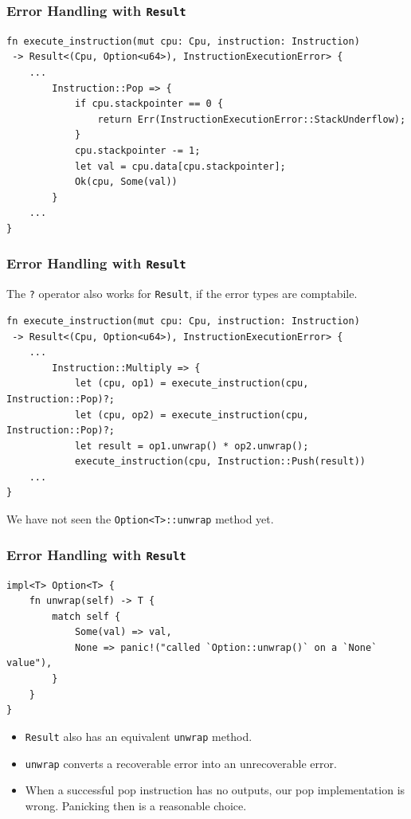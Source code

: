 \begin{frame}[fragile]
    \frametitle{Error Handling with \texttt{Result}}
    \begin{verbatim}
fn execute_instruction(mut cpu: Cpu, instruction: Instruction)
 -> Result<(Cpu, Option<u64>), InstructionExecutionError> {
    ...
        Instruction::Pop => {
            if cpu.stackpointer == 0 {
                return Err(InstructionExecutionError::StackUnderflow);
            }
            cpu.stackpointer -= 1;
            let val = cpu.data[cpu.stackpointer];
            Ok(cpu, Some(val))
        }
    ...
}
    \end{verbatim}
\end{frame}

\begin{frame}[fragile]
    \frametitle{Error Handling with \texttt{Result}}
    The \texttt{?} operator also works for \texttt{Result}, if the error types are comptabile.
    \vfill
    \begin{verbatim}
fn execute_instruction(mut cpu: Cpu, instruction: Instruction)
 -> Result<(Cpu, Option<u64>), InstructionExecutionError> {
    ...
        Instruction::Multiply => {
            let (cpu, op1) = execute_instruction(cpu, Instruction::Pop)?;
            let (cpu, op2) = execute_instruction(cpu, Instruction::Pop)?;
            let result = op1.unwrap() * op2.unwrap();
            execute_instruction(cpu, Instruction::Push(result))
    ...
}
    \end{verbatim}
    \pause
    \vfill
    We have not seen the \texttt{Option<T>::unwrap} method yet.
\end{frame}

\begin{frame}[fragile]
    \frametitle{Error Handling with \texttt{Result}}
    \begin{verbatim}
impl<T> Option<T> {
    fn unwrap(self) -> T {
        match self {
            Some(val) => val,
            None => panic!("called `Option::unwrap()` on a `None` value"),
        }
    }
}
    \end{verbatim}
    \pause
    \vfill
    \begin{itemize}
        \item \texttt{Result} also has an equivalent \texttt{unwrap} method.
        \pause
        \item \texttt{unwrap} converts a recoverable error into an unrecoverable error.
        \item When a successful pop instruction has no outputs, our pop implementation is wrong. Panicking then is a reasonable choice.
    \end{itemize}
\end{frame}


